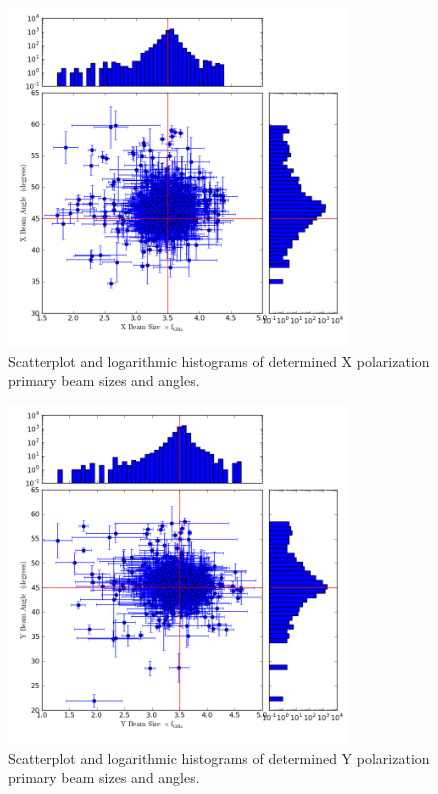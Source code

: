\documentclass[preprint]{aastex}
\begin{document}
\begin{figure}[htb]
\begin{center}
\includegraphics[width=0.8\textwidth]{images/x_magangle}
\caption{Scatterplot and logarithmic histograms of determined X
  polarization primary beam sizes and angles. \label{fig.x_shape}}
\end{center}
\end{figure}

\begin{figure}[htb]
\begin{center}
\includegraphics[width=0.8\textwidth]{images/y_magangle}
\caption{Scatterplot and logarithmic histograms of determined Y
  polarization primary beam sizes and angles. \label{fig.y_shape}}
\end{center}
\end{figure}
\end{document}
